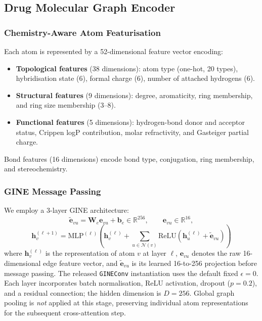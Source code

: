 \documentclass[fleqn,10pt]{wlscirep}
\begin{document}
\subsection{Drug Molecular Graph Encoder}

\subsubsection{Chemistry-Aware Atom Featurisation}

Each atom is represented by a 52-dimensional feature vector encoding:
\begin{itemize}[leftmargin=*]
\item \textbf{Topological features} (38 dimensions): atom type (one-hot,
  20 types), hybridisation state (6), formal charge (6), number of
  attached hydrogens (6).
\item \textbf{Structural features} (9 dimensions): degree, aromaticity, ring
  membership, and ring size membership (3--8).
\item \textbf{Functional features} (5 dimensions): hydrogen-bond donor and
  acceptor status, Crippen logP contribution, molar refractivity, and Gasteiger
  partial charge.
\end{itemize}
Bond features (16 dimensions) encode bond type, conjugation, ring membership,
and stereochemistry.

\subsubsection{GINE Message Passing}

We employ a 3-layer GINE
architecture:\cite{hu2020strategies}
\begin{equation}
\widetilde{\mathbf{e}}_{vu}=\mathbf{W}_e\mathbf{e}_{vu}+\mathbf{b}_e
\in\mathbb{R}^{256},\qquad \mathbf{e}_{vu}\in\mathbb{R}^{16},
\label{eq:edge_projection}
\end{equation}
\begin{equation}
\mathbf{h}_v^{(\ell+1)} = \mathrm{MLP}^{(\ell)}\!\left(
  \mathbf{h}_v^{(\ell)} +
  \sum_{u\in\mathcal{N}(v)}
  \mathrm{ReLU}\!\left(\mathbf{h}_u^{(\ell)} + \widetilde{\mathbf{e}}_{vu}\right)
\right)
\end{equation}
where $\mathbf{h}_v^{(\ell)}$ is the representation of atom $v$ at layer $\ell$,
$\mathbf{e}_{vu}$ denotes the raw 16-dimensional edge feature vector, and
$\widetilde{\mathbf{e}}_{vu}$ is its learned 16-to-256 projection before message
passing. The released \texttt{GINEConv} instantiation uses the default fixed
$\epsilon=0$. Each layer incorporates batch normalisation, ReLU activation,
dropout ($p=0.2$), and a residual connection; the hidden dimension is $D=256$.
Global graph pooling is \emph{not} applied at this stage, preserving individual
atom representations for the subsequent cross-attention step.
\end{document}
